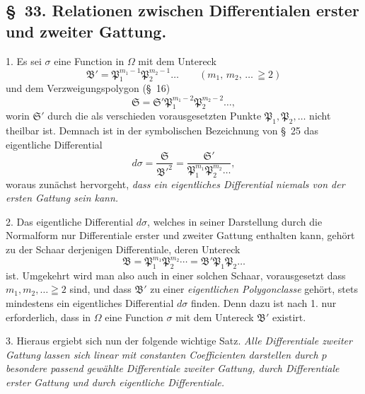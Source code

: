 \documentclass{article}
\begin{document}
\subsection*{§~33. Relationen zwischen Differentialen erster und zweiter Gattung.}

1. Es sei $\sigma$ eine Function in $\Omega$ mit dem Untereck
\[ \mathfrak{B}' = \mathfrak{P}_{1}^{m_{1}-1}\mathfrak{P}_{2}^{m_{2}-1}\ldots \qquad {\scriptstyle (m_{1},\, m_{2},\, \ldots\, \geqq 2)} \]
und dem Verzweigungspolygon (§~16)
\[ \mathfrak{S} = \mathfrak{S}'\mathfrak{P}_{1}^{m_{1}-2}\mathfrak{P}_{2}^{m_{2}-2}\ldots, \]
worin $\mathfrak{S}'$ durch die als verschieden vorausgesetzten Punkte $\mathfrak{P}_{1}, \mathfrak{P}_{2}, \ldots$ nicht theilbar ist. Demnach ist in der symbolischen Bezeichnung von §~25 das eigentliche Differential
\[ d\sigma = \frac{\mathfrak{S}}{\mathfrak{B}'^{2}} = \frac{\mathfrak{S}'}{\mathfrak{P}_{1}^{m_{1}}\mathfrak{P}_{2}^{m_{2}}\ldots}, \]
woraus zunächst hervorgeht, \emph{dass ein eigentliches Differential niemals von der ersten Gattung sein kann.}


2. Das eigentliche Differential $d\sigma$, welches in seiner Darstellung durch die Normalform nur Differentiale erster und zweiter Gattung enthalten kann, gehört zu der Schaar derjenigen Differentiale, deren Untereck
\[ \mathfrak{B} = \mathfrak{P}_{1}^{m_{1}}\mathfrak{P}_{2}^{m_{2}}\cdots = \mathfrak{B}'\mathfrak{P}_{1}\mathfrak{P}_{2}\ldots \]
ist. Umgekehrt wird man also auch in einer solchen Schaar, vorausgesetzt dass $m_{1}, m_{2}, \ldots \geqq 2$ sind, und dass $\mathfrak{B}'$ zu einer \emph{eigentlichen Polygonclasse} gehört, stets mindestens ein eigentliches Differential $d\sigma$ finden. Denn dazu ist nach 1. nur erforderlich, dass in $\Omega$ eine Function $\sigma$ mit dem Untereck $\mathfrak{B}'$ existirt.

3. Hieraus ergiebt sich nun der folgende wichtige Satz. \emph{Alle Differentiale zweiter Gattung lassen sich linear mit constanten Coefficienten darstellen durch $p$ besondere passend gewählte Differentiale zweiter Gattung, durch Differentiale erster Gattung und durch eigentliche Differentiale.}
\end{document}

